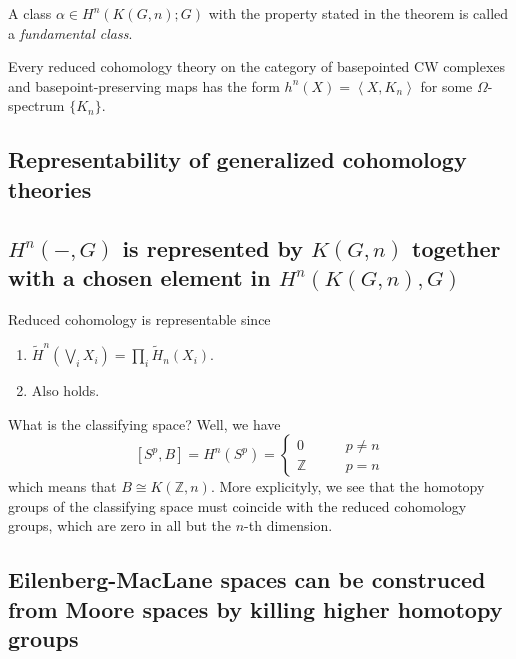 \begin{definition}
\label{definition-fundamental-class}
	A class $\alpha\in H^{n}(K(G,n);G)$ with the
	property stated in the theorem is called a
	{\it fundamental class}.
\end{definition}


\begin{theorem}[4E.1]
\label{theorem-4e-1}
	Every reduced cohomology theory on the
	category of basepointed CW complexes and
	basepoint-preserving maps has the form
	$h^{n} (X)=\left\langle{}X,K_{n} \right\rangle{} $ for some
	$\Omega$-spectrum $\{K_{n}\} $.
\end{theorem}


\subsection{Representability of generalized
cohomology theories}
\label{subsection-repre-gener-cohom-theor}

\subsection{$H^{n}(-,G)$ is represented by
$K(G,n)$ together with a chosen element in
$H^{n}(K(G,n),G)$}
\label{subsection-h-n-g-repre-k-g-n-toget}

Reduced cohomology is representable since

\begin{enumerate}
	\item[(i)]
	$\widetilde{H}^{n}(\bigvee_{i}X_{i})=
	\prod_{i}
	\widetilde{H}_{n}(X_{i})$.
	\item[(ii)] Also holds.
\end{enumerate}

What is the classifying space? Well, we have
$$[S^{p},B]=H^{n}(S^{p})=\begin{cases}
	0\qquad &p\neq n\\
	\mathbb{Z}\qquad &p=n
\end{cases}$$
which means that $B\cong K(\mathbb{Z},n)$.
More explicityly, we see that the homotopy
groups of the classifying space must coincide
with the reduced cohomology groups, which are
zero in all but the $n$-th dimension.

\subsection{Eilenberg-MacLane spaces can be
construced from Moore spaces by killing
higher homotopy groups}
\label{subsection-eilen-macla-space-can}
